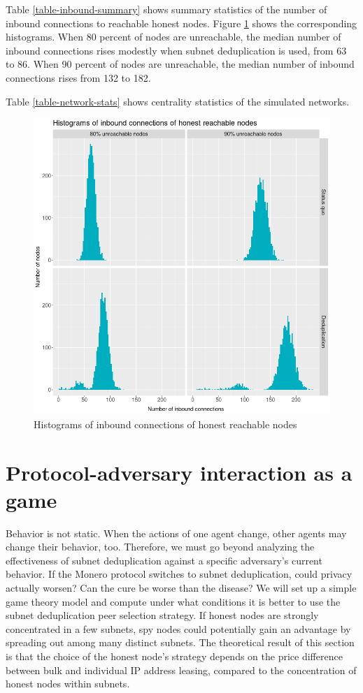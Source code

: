 \documentclass[english]{mrl}
\theoremstyle{plain}
\begin{document}
Table \ref{table-inbound-summary} shows summary statistics of the
number of inbound connections to reachable honest nodes. Figure \ref{fig-histogram-inbound}
shows the corresponding histograms. When 80 percent of nodes are unreachable,
the median number of inbound connections rises modestly when subnet
deduplication is used, from 63 to 86. When 90 percent of nodes are
unreachable, the median number of inbound connections rises from 132
to 182.

Table \ref{table-network-stats} shows centrality statistics of the
simulated networks.

\begin{figure}

\caption{Histograms of inbound connections of honest reachable nodes}
\label{fig-histogram-inbound}
\centering{}\includegraphics[scale=0.5]{images/inbound-histogram}
\end{figure}


\section{Protocol-adversary interaction as a game}

Behavior is not static. When the actions of one agent change, other
agents may change their behavior, too. Therefore, we must go beyond
analyzing the effectiveness of subnet deduplication against a specific
adversary's current behavior. If the Monero protocol switches to subnet
deduplication, could privacy actually worsen? Can the cure be worse
than the disease? We will set up a simple game theory model and compute
under what conditions it is better to use the subnet deduplication
peer selection strategy. If honest nodes are strongly concentrated
in a few subnets, spy nodes could potentially gain an advantage by
spreading out among many distinct subnets. The theoretical result
of this section is that the choice of the honest node's strategy depends
on the price difference between bulk and individual IP address leasing,
compared to the concentration of honest nodes within subnets.
\end{document}
